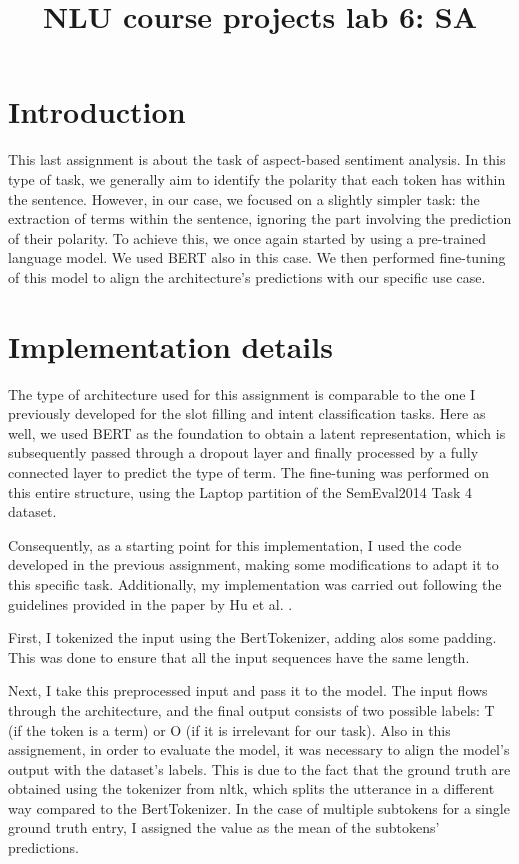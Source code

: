 \documentclass[a4paper]{article}
\title{NLU course projects lab 6: SA}
\begin{document}
\maketitle

\section{Introduction}
This last assignment is about the task of aspect-based sentiment analysis.
In this type of task, we generally aim to identify the polarity that each token has within the sentence. However, in our case, we focused on a slightly simpler task: the extraction of terms within the sentence, ignoring the part involving the prediction of their polarity.
To achieve this, we once again started by using a pre-trained language model. We used BERT also in this case. We then performed fine-tuning of this model to align the architecture’s predictions with our specific use case.

\section{Implementation details}
The type of architecture used for this assignment is comparable to the one I previously developed for the slot filling and intent classification tasks.
Here as well, we used BERT as the foundation to obtain a latent representation, which is subsequently passed through a dropout layer and finally processed by a fully connected layer to predict the type of term. The fine-tuning was performed on this entire structure, using the Laptop partition of the SemEval2014 Task 4 dataset.

Consequently, as a starting point for this implementation, I used the code developed in the previous assignment, making some modifications to adapt it to this specific task.
Additionally, my implementation was carried out following the guidelines provided in the paper by Hu et al. \cite{hu2019opendomaintargetedsentimentanalysis}.

First, I tokenized the input using the BertTokenizer, adding alos some padding. This was done to ensure that all the input sequences have the same length.

Next, I take this preprocessed input and pass it to the model. The input flows through the architecture, and the final output consists of two possible labels: T (if the token is a term) or O (if it is irrelevant for our task).
Also in this assignement, in order to evaluate the model, it was necessary to align the model’s output with the dataset’s labels. This is due to the fact that the ground truth are obtained using the tokenizer from nltk, which splits the utterance in a different way compared to the BertTokenizer.
In the case of multiple subtokens for a single ground truth entry, I assigned the value as the mean of the subtokens’ predictions.
\end{document}
